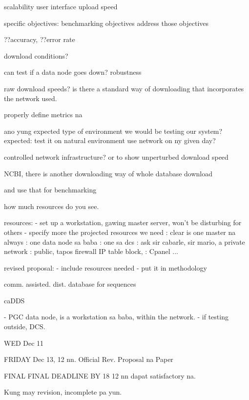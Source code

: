 scalability
user interface
upload speed

specific objectives:
benchmarking objectives address those objectives

??accuracy, ??error rate

download conditions? 

can test if a data node goes down? robustness

raw download speeds? is there a standard way of downloading that incorporates the network used.

properly define metrics na

ano yung expected type of environment we would be testing our system? 
expected: test it on natural environment
use network on ny given day?

controlled network infrastructure? or to show unperturbed download speed

NCBI, there is another downloading way of whole database download

and use that for benchmarking

how much resources do you see.

resources:
- set up a workstation, gawing master server, won't be disturbing for others
- specify more the projected resources we need
: clear is one master na always
: one data node sa baba
: one sa dcs
: ask sir cabarle, sir mario, a private network
: public, tapos firewall IP table block,
: Cpanel ...

revised proposal:
- include resources needed
- put it in methodology


comm. assisted. dist. database for sequences

caDDS

- PGC data node, is a workstation sa baba, within the network.
- if testing outside, DCS.

WED Dec 11

FRIDAY Dec 13, 12 nn. Official Rev. Proposal na Paper

FINAL FINAL DEADLINE BY 18 12 nn dapat satisfactory na. 

Kung may revision, incomplete pa yun.